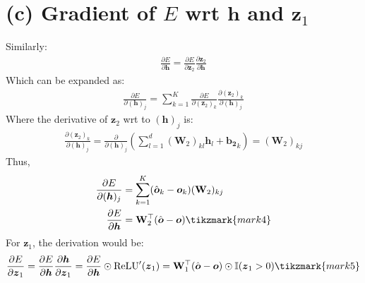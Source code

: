 \documentclass[11pt, a4paper, oneside]{memoir}
\begin{document}
\section*{(c) Gradient of $E$ wrt $\boldsymbol{h}$ and $\boldsymbol{z}_1$}
Similarly:
\begin{align*}
    \frac{\partial E}{\partial \boldsymbol{h}} = \frac{\partial E}{\partial \boldsymbol{z}_2} \frac{\partial \boldsymbol{z}_2}{\partial \boldsymbol{h}}
\end{align*}
Which can be expanded as:
\begin{align*}
    \frac{\partial E}{\partial (\boldsymbol{h})_j} = \sum_{k=1}^{K} \frac{\partial E}{\partial (\boldsymbol{z}_2)_k} \frac{\partial (\boldsymbol{z}_2)_k}{\partial (\boldsymbol{h})_j}
\end{align*}
Where the derivative of $\boldsymbol{z}_2$ wrt to $(\boldsymbol{h})_j$ is:
\begin{align*}
    \frac{\partial (\boldsymbol{z}_2)_k}{\partial (\boldsymbol{h})_j} = \frac{\partial}{\partial (\boldsymbol{h})_j} \left( \sum_{l=1}^{d} (\mathbf{W}_2)_{kl} \boldsymbol{h}_l + \boldsymbol{b_2}_k \right) = (\mathbf{W}_2)_{kj}
\end{align*}
Thus,
\begin{align*}
    \frac{\partial E}{\partial (\boldsymbol{h})_j} &= \sum_{k=1}^{K} (\hat{\boldsymbol{o}}_k - \boldsymbol{o}_k) (\mathbf{W}_2)_{kj} \\
    \frac{\partial E}{\partial \boldsymbol{h}} &= \mathbf{W}_2^\top (\hat{\boldsymbol{o}} - \boldsymbol{o})
    \tikzmark{mark4}
\end{align*}
For $\boldsymbol{z}_1$, the derivation would be:
\begin{align*}
    \frac{\partial E}{\partial \boldsymbol{z}_1} = \frac{\partial E}{\partial \boldsymbol{h}} \frac{\partial \boldsymbol{h}}{\partial \boldsymbol{z}_1} = 
    \frac{\partial E}{\partial \boldsymbol{h}} \odot \text{ReLU}'(\boldsymbol{z}_1) = \mathbf{W}_1^\top (\hat{\boldsymbol{o}} - \boldsymbol{o}) \odot \mathbb{I}(\boldsymbol{z}_1 > 0)
    \tikzmark{mark5}
\end{align*}
\end{document}

